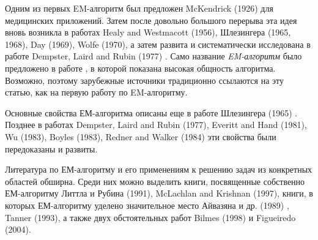 Одним из первых EM-алгоритм был предложен McKendrick (1926) для медицинских приложений. Затем после довольно большого перерыва эта идея вновь возникла в работах Healy and Westmacott (1956), Шлезингера (1965, 1968), Day (1969), Wolfe (1970), а затем развита  и систематически исследована в работе Dempster, Laird and Rubin (1977) \cite{first}. Само название \emph{EM-алгоритм} было предложено в работе \cite{first}, в которой показана высокая общность алгоритма. Возможно, поэтому зарубежные источники традиционно ссылаются на эту статью, как на первую работу по EM-алгоритму.

Основные свойства ЕМ-алгоритма описаны еще в работе Шлезингера (1965) \cite{second}. Позднее в работах Dempster, Laird and Rubin (1977), Everitt and Hand (1981), Wu (1983), Boyles (1983), Redner and Walker (1984) эти свойства были передоказаны и развиты.

Литература по ЕМ-алгоритму и его применениям к решению задач из конкретных областей обширна. Среди них можно выделить книги, посвященные собственно ЕМ-алгоритму Литтла и Рубина (1991), McLachlan and Krishnan (1997), книги, в которых ЕМ-алгоритму уделено значительное место Айвазяна и др. (1989) \cite{third}, Tanner (1993), а также двух обстоятельных работ Bilmes (1998) и Figueiredo (2004).